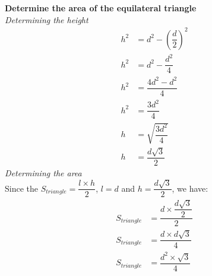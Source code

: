 \documentclass[12pt]{book}
\begin{document}
\begin{enumerate}
\textbf{Determine the area of the equilateral triangle}\\
\textit{Determining the height}
\setcounter{equation}{0} %
\begin{align}
    h^2 &= d^2 - \left(\dfrac{d}{2}\right)^2\\
    h^2 &= d^2 - \dfrac{d^2}{4}\\
    h^2 &= \dfrac{4d^2-d^2}{4}\\
    h^2 &= \dfrac{3d^2}{4}\\
    h &= \sqrt{\dfrac{3d^2}{4}}\\
    h &= \dfrac{d\sqrt{3}}{2}
\end{align}
\textit{Determining the area}\\
Since the $S_{triangle} = \dfrac{l \times h}{2}$, $l = d$ and $h = \dfrac{d\sqrt{3}}{2}$, we have:
\setcounter{equation}{0}
\begin{align}
    S_{triangle} &= \dfrac{d \times \dfrac{d\sqrt{3}}{2}}{2}\\
    S_{triangle} &= \dfrac{d \times d\sqrt{3}}{4}\\
    S_{triangle} &= \dfrac{d^2 \times \sqrt{3}}{4}
\end{align}\\


\end{enumerate}
\end{document}
